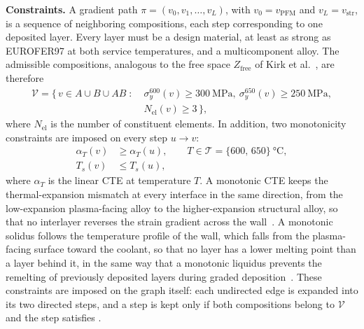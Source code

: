 \textbf{Constraints.} A gradient path \(\pi=(v_0,v_1,\dots,v_L)\), with
\(v_0=v_{\mathrm{PFM}}\) and \(v_L=v_{\mathrm{str}}\), is a sequence of neighboring
compositions, each step corresponding to one deposited layer. Every layer must be a
design material, at least as strong as EUROFER97 at both service temperatures, and
a multicomponent alloy. The admissible compositions, analogous to the free space
\(Z_{\mathrm{free}}\) of Kirk et al.~\cite{kirk2018gradient}, are therefore
\begin{equation}
\begin{aligned}
\mathcal{V} = \bigl\{\, v \in A \cup B \cup AB \;:\;
  & \sigma_y^{600}(v) \ge \SI{300}{\mega\pascal},\
    \sigma_y^{650}(v) \ge \SI{250}{\mega\pascal},\\
  & N_{\mathrm{el}}(v) \ge 3 \,\bigr\},
\end{aligned}
\label{eq:admissible}
\end{equation}
where \(N_{\mathrm{el}}\) is the number of constituent elements. In addition, two
monotonicity constraints are imposed on every step \(u \to v\):
\begin{equation}
\begin{aligned}
\alpha_T(v) &\ge \alpha_T(u), \qquad T \in \mathcal{T}=\{600,\, 650\}~\si{\celsius},\\
T_s(v) &\le T_s(u),
\end{aligned}
\label{eq:monotone}
\end{equation}
where \(\alpha_T\) is the linear CTE at temperature \(T\).
A monotonic CTE keeps the thermal-expansion mismatch at every interface in the same
direction, from the low-expansion plasma-facing alloy to the higher-expansion
structural alloy, so that no interlayer reverses the strain gradient across the
wall~\cite{kirk2021monotonic}. A monotonic solidus follows the temperature profile
of the wall, which falls from the plasma-facing surface toward the coolant, so that
no layer has a lower melting point than a layer behind it, in the same way that a
monotonic liquidus prevents the remelting of previously deposited layers during
graded deposition~\cite{glerum2026ss316tzm}. These constraints are imposed on the
graph itself: each undirected edge is expanded into its two directed steps, and a
step is kept only if both compositions belong to \(\mathcal{V}\) and the step
satisfies \Cref{eq:monotone}.

